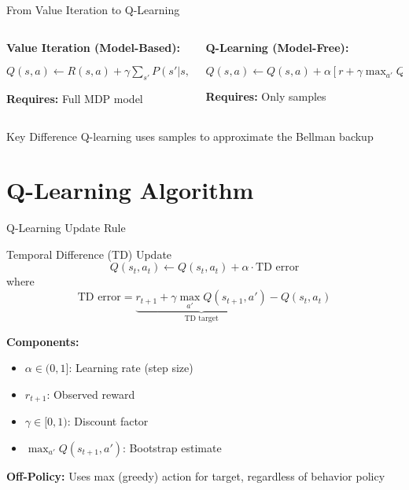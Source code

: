 \documentclass[aspectratio=169,10pt]{beamer}
\begin{document}
\begin{frame}{From Value Iteration to Q-Learning}
\begin{columns}[T]
\begin{column}{0.5\textwidth}
\textbf{Value Iteration (Model-Based):}
\begin{algorithmic}
        \STATE $Q(s,a) \leftarrow R(s,a) + \gamma \sum_{s'} P(s'|s,a) \max_{a'} Q(s',a')$
    \ENDFOR
\ENDFOR
\end{algorithmic}
\textbf{Requires:} Full MDP model
\end{column}
\begin{column}{0.5\textwidth}
\textbf{Q-Learning (Model-Free):}
\begin{algorithmic}
    \STATE $Q(s,a) \leftarrow Q(s,a) + \alpha[r + \gamma \max_{a'} Q(s',a') - Q(s,a)]$
\ENDFOR
\end{algorithmic}
\textbf{Requires:} Only samples
\end{column}
\end{columns}

\vspace{1em}
\begin{alertblock}{Key Difference}
Q-learning uses samples to approximate the Bellman backup
\end{alertblock}
\end{frame}

\section{Q-Learning Algorithm}

\begin{frame}{Q-Learning Update Rule}
\begin{block}{Temporal Difference (TD) Update}
$$Q(s_t, a_t) \leftarrow Q(s_t, a_t) + \alpha \cdot \text{TD error}$$
where
$$\text{TD error} = \underbrace{r_{t+1} + \gamma \max_{a'} Q(s_{t+1}, a')}_{\text{TD target}} - Q(s_t, a_t)$$
\end{block}

\textbf{Components:}
\begin{itemize}
    \item $\alpha \in (0,1]$: Learning rate (step size)
    \item $r_{t+1}$: Observed reward
    \item $\gamma \in [0,1)$: Discount factor
    \item $\max_{a'} Q(s_{t+1}, a')$: Bootstrap estimate
\end{itemize}

\textbf{Off-Policy:} Uses max (greedy) action for target, regardless of behavior policy
\end{frame}
\end{document}
